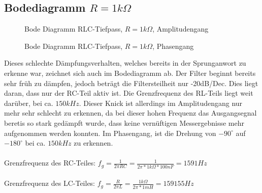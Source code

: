 \subsection{Bodediagramm $R=1k\Omega$}

\begin{figure}[H]
  \centering
  \caption{Bode Diagramm RLC-Tiefpass, $R=1k\Omega$, Amplitudengang}
\end{figure}
\begin{figure}[H]
  \centering
  \caption{Bode Diagramm RLC-Tiefpass, $R=1k\Omega$, Phasengang}
\end{figure}
Dieses schlechte D\"ampfungsverhalten, welches bereits in der Sprunganwort zu erkenne war, zeichnet sich auch im Bodediagramm ab. Der Filter beginnt bereits sehr fr\"uh zu d\"ampfen, jedoch betr\"agt die Filtersteilheit nur -20dB/Dec. Dies liegt daran, dass nur der RC-Teil aktiv ist. Die Grenzfrequenz des RL-Teils liegt weit dar\"uber, bei ca. $150kHz$. Dieser Knick ist allerdings im Amplitudengang nur mehr sehr schlecht zu erkennen, da bei dieser hohen Frequenz das Ausgangsegnal beretis so stark ged\"ampft wurde, dass keine vern\"uftigen Messergebnisse mehr aufgenommen werden konnten. Im Phasengang, ist die Drehung von $-90^\circ$ auf $-180^\circ$ bei ca. $150kHz$ zu erkennen. \\ \\
Grenzfrequenz des RC-Teiles: $f_g=\frac{1}{2\pi RC}=\frac{1}{2\pi*1k\Omega *100nF}=1591Hz$ \\ \\
Grenzfrequenz des LC-Teiles: $f_g=\frac{R}{2\pi L} = \frac{1k\Omega}{2\pi*1mH}=159155Hz$

